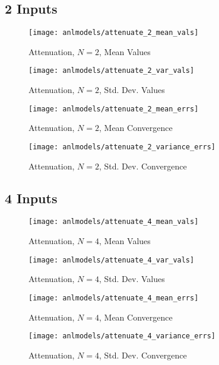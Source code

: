 \subsection{2 Inputs}
\begin{figure}[H]
  \centering
  \texttt{[image: anlmodels/attenuate\_2\_mean\_vals]}
  \caption{Attenuation, $N=2$, Mean Values}
  \label{fig:attenuate mean values 2}
\end{figure}
\begin{figure}[H]
  \centering
  \texttt{[image: anlmodels/attenuate\_2\_var\_vals]}
  \caption{Attenuation, $N=2$, Std. Dev. Values}
  \label{fig:attenuate var values 2}
\end{figure}

\begin{figure}[H]
  \centering
  \texttt{[image: anlmodels/attenuate\_2\_mean\_errs]}
  \caption{Attenuation, $N=2$, Mean Convergence}
  \label{fig:attenuate mean errors 2}
\end{figure}
\begin{figure}[H]
  \centering
  \texttt{[image: anlmodels/attenuate\_2\_variance\_errs]}
  \caption{Attenuation, $N=2$, Std. Dev. Convergence}
  \label{fig:attenuate var errors 2}
\end{figure}


\subsection{4 Inputs}
\begin{figure}[H]
  \centering
  \texttt{[image: anlmodels/attenuate\_4\_mean\_vals]}
  \caption{Attenuation, $N=4$, Mean Values}
  \label{fig:attenuate mean values 4}
\end{figure}
\begin{figure}[H]
  \centering
  \texttt{[image: anlmodels/attenuate\_4\_var\_vals]}
  \caption{Attenuation, $N=4$, Std. Dev. Values}
  \label{fig:attenuate var values 4}
\end{figure}

\begin{figure}[H]
  \centering
  \texttt{[image: anlmodels/attenuate\_4\_mean\_errs]}
  \caption{Attenuation, $N=4$, Mean Convergence}
  \label{fig:attenuate mean errors 4}
\end{figure}
\begin{figure}[H]
  \centering
  \texttt{[image: anlmodels/attenuate\_4\_variance\_errs]}
  \caption{Attenuation, $N=4$, Std. Dev. Convergence}
  \label{fig:attenuate var errors 4}
\end{figure}

